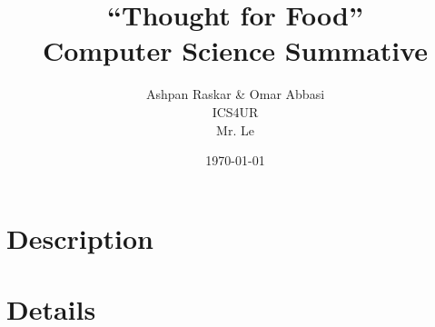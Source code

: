 \documentclass[12pt, letterpaper, titlepage]{article}
\title{``Thought for Food''\\
	Computer Science Summative}
\author{Ashpan Raskar \& Omar Abbasi\\
	ICS4UR\\
	Mr. Le}
\date{\today}
\begin{document}
	\doublespacing
	\maketitle
	\setcounter{secnumdepth}{0}
	\section{Description}
	\Blindtext
	\section{Details}
	\blindmathtrue
	\blindtext
	\blindmathfalse	
\end{document}

